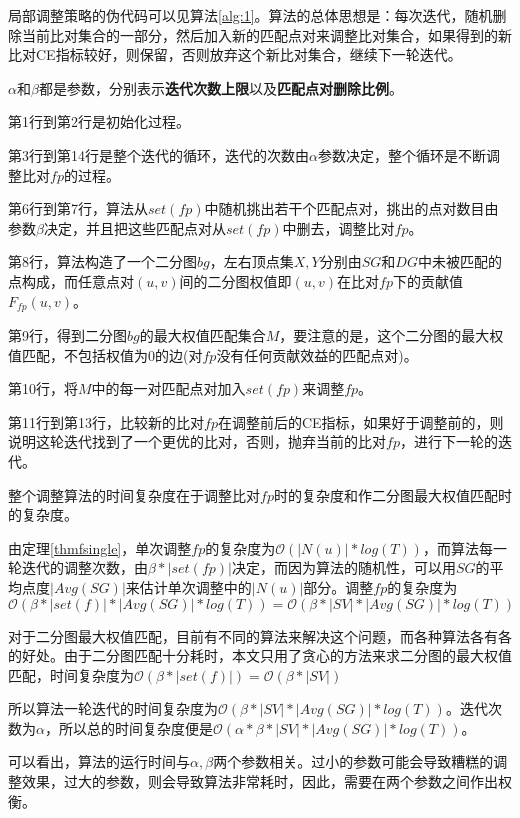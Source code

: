 局部调整策略的伪代码可以见算法\ref{alg:1}。算法的总体思想是：每次迭代，随机删除当前比对集合的一部分，然后加入新的匹配点对来调整比对集合，如果得到的新比对CE指标较好，则保留，否则放弃这个新比对集合，继续下一轮迭代。

$\alpha$和$\beta$都是参数，分别表示\textbf{迭代次数上限}以及\textbf{匹配点对删除比例}。

第1行到第2行是初始化过程。

第3行到第14行是整个迭代的循环，迭代的次数由$\alpha$参数决定，整个循环是不断调整比对$fp$的过程。

第6行到第7行，算法从$set(fp)$中随机挑出若干个匹配点对，挑出的点对数目由参数$\beta$决定，并且把这些匹配点对从$set(fp)$中删去，调整比对$fp$。

第8行，算法构造了一个二分图$bg$，左右顶点集$X,Y$分别由$SG$和$DG$中未被匹配的点构成，而任意点对$(u,v)$间的二分图权值即$(u,v)$在比对$fp$下的贡献值$F_{fp}(u,v)$。

第9行，得到二分图$bg$的最大权值匹配集合$M$，要注意的是，这个二分图的最大权值匹配，不包括权值为0的边(对$fp$没有任何贡献效益的匹配点对)。

第10行，将$M$中的每一对匹配点对加入$set(fp)$来调整$fp$。

第11行到第13行，比较新的比对$fp$在调整前后的CE指标，如果好于调整前的，则说明这轮迭代找到了一个更优的比对，否则，抛弃当前的比对$fp$，进行下一轮的迭代。

整个调整算法的时间复杂度在于调整比对$fp$时的复杂度和作二分图最大权值匹配时的复杂度。

由定理\ref{thmfsingle}，单次调整$fp$的复杂度为$\mathcal{O}(|N(u)|*log(T))$，而算法每一轮迭代的调整次数，由$\beta*|set(fp)|$决定，而因为算法的随机性，可以用$SG$的平均点度$|Avg(SG)|$来估计单次调整中的$|N(u)|$部分。调整$fp$的复杂度为$\mathcal{O}(\beta*|set(f)|*|Avg(SG)|*log(T))=\mathcal{O}(\beta*|SV|*|Avg(SG)|*log(T))$

对于二分图最大权值匹配，目前有不同的算法来解决这个问题，而各种算法各有各的好处。由于二分图匹配十分耗时，本文只用了贪心的方法来求二分图的最大权值匹配，时间复杂度为$\mathcal{O}(\beta*|set(f)|)=\mathcal{O}(\beta*|SV|)$

所以算法一轮迭代的时间复杂度为$\mathcal{O}(\beta*|SV|*|Avg(SG)|*log(T))$。迭代次数为$\alpha$，所以总的时间复杂度便是$\mathcal{O}(\alpha*\beta*|SV|*|Avg(SG)|*log(T))$。

可以看出，算法的运行时间与$\alpha,\beta$两个参数相关。过小的参数可能会导致糟糕的调整效果，过大的参数，则会导致算法非常耗时，因此，需要在两个参数之间作出权衡。

